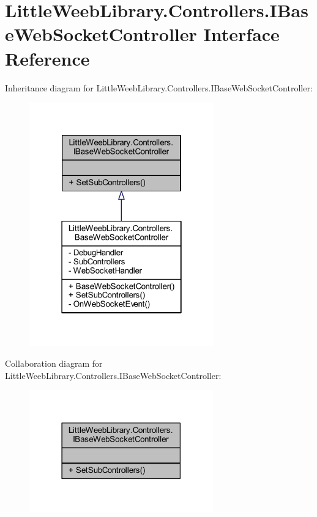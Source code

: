 \hypertarget{interface_little_weeb_library_1_1_controllers_1_1_i_base_web_socket_controller}{}\section{Little\+Weeb\+Library.\+Controllers.\+I\+Base\+Web\+Socket\+Controller Interface Reference}
\label{interface_little_weeb_library_1_1_controllers_1_1_i_base_web_socket_controller}


Inheritance diagram for Little\+Weeb\+Library.\+Controllers.\+I\+Base\+Web\+Socket\+Controller\+:\nopagebreak
\begin{figure}[H]
\begin{center}
\leavevmode
\includegraphics[width=226pt]{interface_little_weeb_library_1_1_controllers_1_1_i_base_web_socket_controller__inherit__graph}
\end{center}
\end{figure}


Collaboration diagram for Little\+Weeb\+Library.\+Controllers.\+I\+Base\+Web\+Socket\+Controller\+:\nopagebreak
\begin{figure}[H]
\begin{center}
\leavevmode
\includegraphics[width=225pt]{interface_little_weeb_library_1_1_controllers_1_1_i_base_web_socket_controller__coll__graph}
\end{center}
\end{figure}

